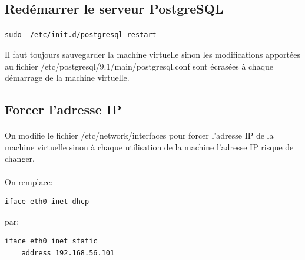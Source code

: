 \documentclass{report}
\begin{document}
		\subsection*{Redémarrer le serveur PostgreSQL}

			\paragraph{}{
\begin{lstlisting}
sudo  /etc/init.d/postgresql restart
\end{lstlisting}

					Il faut toujours sauvegarder la machine virtuelle sinon les modifications apportées au fichier /etc/postgresql/9.1/main/postgresql.conf sont écrasées à chaque démarrage de la machine virtuelle.

			}


		\subsection*{Forcer l’adresse IP}

			\paragraph{}{
				On modifie le fichier /etc/network/interfaces pour forcer l’adresse IP de la machine virtuelle sinon à chaque utilisation de la machine l’adresse IP risque de  changer.
			}

			\paragraph{}{
				On remplace:
\begin{lstlisting}
iface eth0 inet dhcp
\end{lstlisting}

				par:

\begin{lstlisting}
iface eth0 inet static
	address 192.168.56.101
\end{lstlisting}

			}
\end{document}
